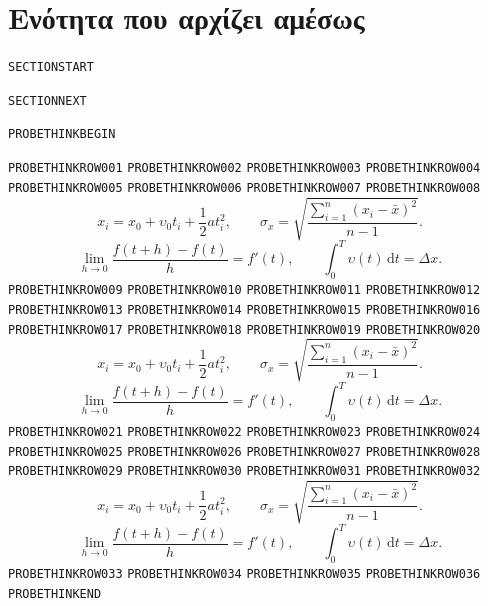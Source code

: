\section{Ενότητα που αρχίζει αμέσως}
\texttt{SECTIONSTART}\par\EditorialProbeParagraph
\clearpage
\texttt{SECTIONNEXT}\par\EditorialProbeParagraph
\clearpage
\begin{ThinkBox}
\texttt{PROBETHINKBEGIN}\par
\texttt{PROBETHINKROW001}\quad\EditorialProbeParagraph
\texttt{PROBETHINKROW002}\quad\EditorialProbeParagraph
\texttt{PROBETHINKROW003}\quad\EditorialProbeParagraph
\texttt{PROBETHINKROW004}\quad\EditorialProbeParagraph
\texttt{PROBETHINKROW005}\quad\EditorialProbeParagraph
\texttt{PROBETHINKROW006}\quad\EditorialProbeParagraph
\texttt{PROBETHINKROW007}\quad\EditorialProbeParagraph
\texttt{PROBETHINKROW008}\quad\EditorialProbeParagraph
\[
 x_i=x_0+\upsilon_0t_i+\frac12at_i^2,\qquad
 \sigma_x=\sqrt{\frac{\sum_{i=1}^{n}(x_i-\bar{x})^2}{n-1}}.
\]
\[
 \lim_{h\to0}\frac{f(t+h)-f(t)}{h}=f'(t),\qquad
 \int_0^T\upsilon(t)\,\mathrm{d}t=\Delta x.
\]
\texttt{PROBETHINKROW009}\quad\EditorialProbeParagraph
\texttt{PROBETHINKROW010}\quad\EditorialProbeParagraph
\texttt{PROBETHINKROW011}\quad\EditorialProbeParagraph
\texttt{PROBETHINKROW012}\quad\EditorialProbeParagraph
\texttt{PROBETHINKROW013}\quad\EditorialProbeParagraph
\texttt{PROBETHINKROW014}\quad\EditorialProbeParagraph
\texttt{PROBETHINKROW015}\quad\EditorialProbeParagraph
\texttt{PROBETHINKROW016}\quad\EditorialProbeParagraph
\texttt{PROBETHINKROW017}\quad\EditorialProbeParagraph
\texttt{PROBETHINKROW018}\quad\EditorialProbeParagraph
\texttt{PROBETHINKROW019}\quad\EditorialProbeParagraph
\texttt{PROBETHINKROW020}\quad\EditorialProbeParagraph
\[
 x_i=x_0+\upsilon_0t_i+\frac12at_i^2,\qquad
 \sigma_x=\sqrt{\frac{\sum_{i=1}^{n}(x_i-\bar{x})^2}{n-1}}.
\]
\[
 \lim_{h\to0}\frac{f(t+h)-f(t)}{h}=f'(t),\qquad
 \int_0^T\upsilon(t)\,\mathrm{d}t=\Delta x.
\]
\texttt{PROBETHINKROW021}\quad\EditorialProbeParagraph
\texttt{PROBETHINKROW022}\quad\EditorialProbeParagraph
\texttt{PROBETHINKROW023}\quad\EditorialProbeParagraph
\texttt{PROBETHINKROW024}\quad\EditorialProbeParagraph
\texttt{PROBETHINKROW025}\quad\EditorialProbeParagraph
\texttt{PROBETHINKROW026}\quad\EditorialProbeParagraph
\texttt{PROBETHINKROW027}\quad\EditorialProbeParagraph
\texttt{PROBETHINKROW028}\quad\EditorialProbeParagraph
\texttt{PROBETHINKROW029}\quad\EditorialProbeParagraph
\texttt{PROBETHINKROW030}\quad\EditorialProbeParagraph
\texttt{PROBETHINKROW031}\quad\EditorialProbeParagraph
\texttt{PROBETHINKROW032}\quad\EditorialProbeParagraph
\[
 x_i=x_0+\upsilon_0t_i+\frac12at_i^2,\qquad
 \sigma_x=\sqrt{\frac{\sum_{i=1}^{n}(x_i-\bar{x})^2}{n-1}}.
\]
\[
 \lim_{h\to0}\frac{f(t+h)-f(t)}{h}=f'(t),\qquad
 \int_0^T\upsilon(t)\,\mathrm{d}t=\Delta x.
\]
\texttt{PROBETHINKROW033}\quad\EditorialProbeParagraph
\texttt{PROBETHINKROW034}\quad\EditorialProbeParagraph
\texttt{PROBETHINKROW035}\quad\EditorialProbeParagraph
\texttt{PROBETHINKROW036}\quad\EditorialProbeParagraph
\texttt{PROBETHINKEND}
\end{ThinkBox}
